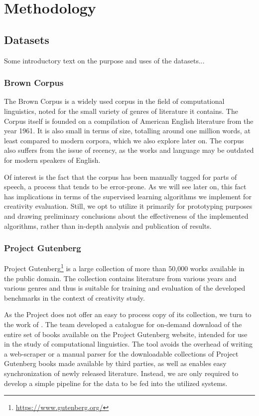 \chapter{Methodology}
\label{chap:methods}

\section{Datasets}
Some introductory text on the purpose and uses of the datasets...
\subsection{Brown Corpus}
The Brown Corpus \citep*{francis1979brown} is a widely used corpus in the field of computational linguistics, noted for the small variety of genres of literature it contains. The Corpus itself is founded on a compilation of American English literature from the year 1961. It is also small in terms of size, totalling around one million words, at least compared to modern corpora, which we also explore later on. The corpus also suffers from the issue of recency, as the works and language may be outdated for modern speakers of English.

Of interest is the fact that the corpus has been manually tagged for parts of speech, a process that tends to be error-prone. %
As we will see later on, this fact has implications in terms of the supervised learning algorithms we implement for creativity evaluation. Still, we opt to utilize it primarily for prototyping purposes and drawing preliminary conclusions about the effectiveness of the implemented algorithms, rather than in-depth analysis and publication of results.

\subsection{Project Gutenberg}
Project Gutenberg\footnote[1]{\url{https://www.gutenberg.org/}} is a large collection of more than 50,000 works available in the public domain. The collection contains literature from various years and various genres and thus is suitable for training and evaluation of the developed benchmarks in the context of creativity study. 

As the Project does not offer an easy to process copy of its collection, we turn to the work of \cite{DBLP:journals/corr/abs-1812-08092}. The team developed a catalogue for on-demand download of the entire set of books available on the Project Gutenberg website, intended for use in the study of computational linguistics. The tool avoids the overhead of writing a web-scraper or a manual parser for the downloadable collections of Project Gutenberg books made available by third parties, as well as enables easy synchronization of newly released literature. Instead, we are only required to develop a simple pipeline for the data to be fed into the utilized systems. 

